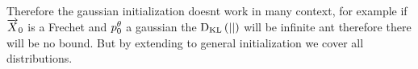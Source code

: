 Therefore the gaussian initialization doesnt work in many context, for example if $\state_0$ is a Frechet and $\discsolution[\param]{0}$ a gaussian the $\kl{}{}$ will be infinite ant therefore there will be no bound. 
But by extending to general initialization we cover all distributions. 

